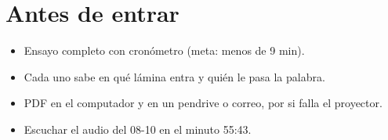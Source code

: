 \documentclass[11pt]{article}
\begin{document}
\section*{Antes de entrar}
\begin{itemize}
\item[$\square$] Ensayo completo con cronómetro (meta: menos de 9 min).
\item[$\square$] Cada uno sabe en qué lámina entra y quién le pasa la palabra.
\item[$\square$] PDF en el computador y en un pendrive o correo, por si falla el proyector.
\item[$\square$] Escuchar el audio del 08-10 en el minuto 55:43.
\end{itemize}
\end{document}
